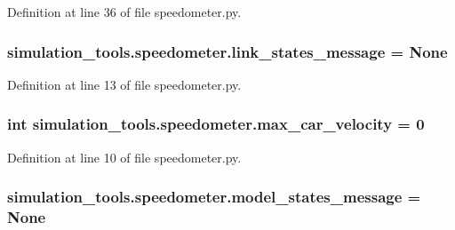 Definition at line 36 of file speedometer.\+py.

\subsubsection[{\texorpdfstring{link\+\_\+states\+\_\+message}{link_states_message}}]{\setlength{\rightskip}{0pt plus 5cm}simulation\+\_\+tools.\+speedometer.\+link\+\_\+states\+\_\+message = None}\hypertarget{namespacesimulation__tools_1_1speedometer_a57927328521dd9b5723725e98c92ab78}{}\label{namespacesimulation__tools_1_1speedometer_a57927328521dd9b5723725e98c92ab78}


Definition at line 13 of file speedometer.\+py.

\subsubsection[{\texorpdfstring{max\+\_\+car\+\_\+velocity}{max_car_velocity}}]{\setlength{\rightskip}{0pt plus 5cm}int simulation\+\_\+tools.\+speedometer.\+max\+\_\+car\+\_\+velocity = 0}\hypertarget{namespacesimulation__tools_1_1speedometer_a4db24fad416ca0a52b89d1529e4c38e9}{}\label{namespacesimulation__tools_1_1speedometer_a4db24fad416ca0a52b89d1529e4c38e9}


Definition at line 10 of file speedometer.\+py.

\subsubsection[{\texorpdfstring{model\+\_\+states\+\_\+message}{model_states_message}}]{\setlength{\rightskip}{0pt plus 5cm}simulation\+\_\+tools.\+speedometer.\+model\+\_\+states\+\_\+message = None}\hypertarget{namespacesimulation__tools_1_1speedometer_acd7f0f18f37f468db40dae82775a6313}{}\label{namespacesimulation__tools_1_1speedometer_acd7f0f18f37f468db40dae82775a6313}


